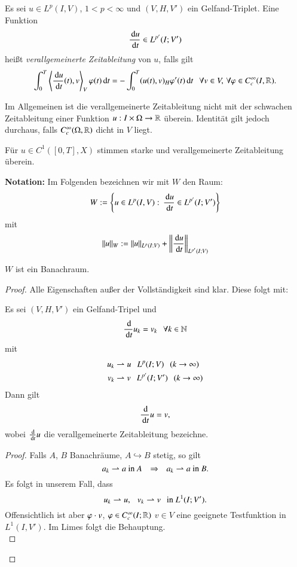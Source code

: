 \begin{defi}\label{4.34}
    Es sei $u\in L^p(I,V)$, $1<p<\infty$ und $(V,H,V')$ ein Gelfand-Triplet. Eine Funktion
    \[
        \frac{\, \mathrm{d} u}{\, \mathrm{d} t} \in L^{p'} (I;V')
    \]
    heißt \textit{verallgemeinerte Zeitableitung} von $u$, falls gilt
    \[
        \int_0^T\left\langle \frac{\, \mathrm{d} u}{\, \mathrm{d} t} (t), v\right\rangle _V \varphi (t)\, \mathrm{d} t = -\int_0^T(u(t),v)_H \varphi'(t)\, \mathrm{d} t
        \hspace{.25cm} \forall v\in V,\, \forall \varphi \in C_c^\infty (I,\mathbb{R}).
    \]
\end{defi}

\begin{remark}
    Im Allgemeinen ist die verallgemeinerte Zeitableitung nicht mit der schwachen Zeitableitung einer
    Funktion $u:I\times \Omega\rightarrow \mathbb{R}$ überein. Identität gilt jedoch durchaus, falls 
    $C^\infty_c(\Omega,\mathbb{R})$ dicht in $V$ liegt.
\end{remark}

\begin{remark}
    Für $u\in C^1([0,T], X)$ stimmen starke und verallgemeinerte Zeitableitung überein. 
\end{remark}

\noindent \textbf{Notation:} Im Folgenden bezeichnen wir mit $W$ den Raum:
\[
    W:=\left\{u\in L^p(I,V): \, \frac{\, \mathrm{d} u}{\, \mathrm{d} t}\in L^{p'}(I; V')\right\}
\]
mit
\[
    \|u\|_W:= \|u\|_{L^p(I;V)} + \left\|\frac{\, \mathrm{d} u}{\, \mathrm{d} t}\right\|_{L^{p'}(I;V)}
\]

\begin{prop}\label{4.34}
    $W$ ist ein Banachraum.
\end{prop}

\begin{proof}
    Alle Eigenschaften außer der Vollständigkeit sind klar. Diese folgt mit:

    \begin{prop}\label{4.35}
        Es sei $(V,H,V')$ ein Gelfand-Tripel und
        \[
            \frac{\, \mathrm{d}}{\, \mathrm{d} t} u_k = v_k \hspace{.25cm} \forall k\in \mathbb{N}
        \]
        mit
        \begin{align*}
            u_k&\rightharpoonup u \hspace{.25cm} L^p(I;V) \hspace{.25cm} (k\rightarrow \infty)\\
            v_k&\rightharpoonup v \hspace{.25cm} L^{p'}(I;V') \hspace{.25cm} (k\rightarrow \infty)
        \end{align*}
        Dann gilt
        \[
            \frac{\, \mathrm{d} }{\, \mathrm{d} t} u =v,
        \]
        wobei $\frac{\, \mathrm{d}}{\, \mathrm{d} t} u$ die verallgemeinerte Zeitableitung bezeichne.
    \end{prop}
    \begin{proof}
        Falls $A$, $B$ Banachräume, $A\hookrightarrow B$ stetig, so gilt 
        \[
            a_k\rightharpoonup a \text{ in }  A \hspace{.25cm} \Rightarrow \hspace{.25cm} a_k\rightharpoonup a \text{ in } B.
        \]
        Es folgt in unserem Fall, dass
        \[
            u_k\rightharpoonup u, \hspace{.25cm} v_k\rightharpoonup v \hspace{.25cm} \text{in }L^1(I;V').
        \]
        Offensichtlich ist aber $\varphi \cdot v$, $\varphi \in C_c^\infty (I;\mathbb{R})$ $v\in V$ eine geeignete
        Testfunktion in $L^1(I,V')$. Im Limes folgt die Behauptung.\[ \]
    \end{proof}
    \[ \]
\end{proof}

